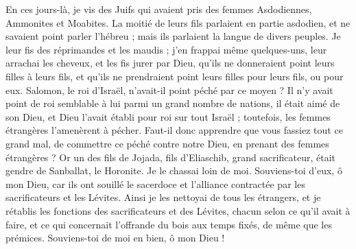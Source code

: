 \begin{multicols}{2}
En ces jours-là, je vis des Juifs qui avaient pris des femmes Asdodiennes, Ammonites et Moabites.
La moitié de leurs fils parlaient en partie asdodien, et ne savaient point parler l’hébreu ; mais ils parlaient la langue de divers peuples.
Je leur fis des réprimandes et les maudis ; j'en frappai même quelques-uns, leur arrachai les cheveux, et les fis jurer par Dieu, qu'ils ne donneraient point leurs filles à leurs fils, et qu'ils ne prendraient point leurs filles pour leurs fils, ou pour eux.
Salomon, le roi d'Israël, n'avait-il point péché par ce moyen ? Il n'y avait point de roi semblable à lui parmi un grand nombre de nations, il était aimé de son Dieu, et Dieu l'avait établi pour roi sur tout Israël ; toutefois, les femmes étrangères l’amenèrent à pécher.
Faut-il donc apprendre que vous fassiez tout ce grand mal, de commettre ce péché contre notre Dieu, en prenant des femmes étrangères ?
Or un des fils de Jojada, fils d'Eliaschib, grand sacrificateur, était gendre de Sanballat, le Horonite. Je le chassai loin de moi.
Souviens-toi d’eux, ô mon Dieu, car ils ont souillé le sacerdoce et l'alliance contractée par les sacrificateurs et les Lévites.
Ainsi je les nettoyai de tous les étrangers, et je rétablis les fonctions des sacrificateurs et des Lévites, chacun selon ce qu'il avait à faire,
et ce qui concernait l'offrande du bois aux temps fixés, de même que les prémices. Souviens-toi de moi en bien, ô mon Dieu !
\PPE{}
\end{multicols}
